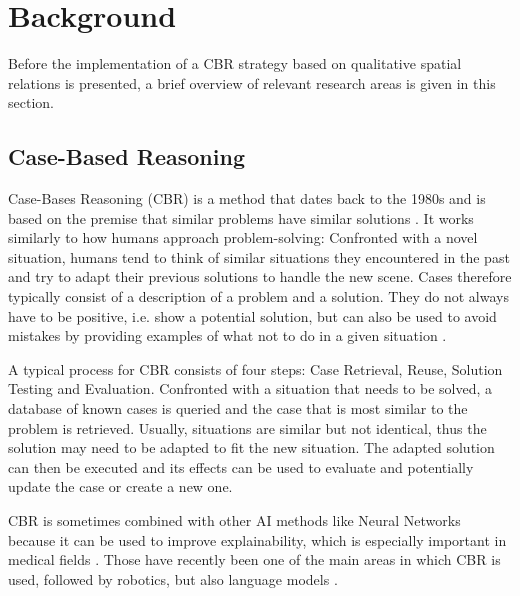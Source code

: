\section{Background}\label{sec:background}

Before the implementation of a \ac{CBR} strategy based on qualitative spatial relations is presented, a brief overview of relevant research areas is given in this section.

\subsection{Case-Based Reasoning}
Case-Bases Reasoning (CBR) is a method that dates back to the 1980s \cite{Schank1983DynamicM} and is based on the premise that similar problems have similar solutions \cite{KI-cbr-2009}.
It works similarly to how humans approach problem-solving: Confronted with a novel situation, humans tend to think of similar situations they encountered in the past and try to adapt their previous solutions to handle the new scene.
Cases therefore typically consist of a description of a problem and a solution.
They do not always have to be positive, i.e. show a potential solution, but can also be used to avoid mistakes by providing examples of what not to do in a given situation \cite{Kolodner1992}.

A typical process for \ac{CBR} consists of four steps: Case Retrieval, Reuse, Solution Testing and Evaluation.\cite{CBR-issues-variations-approaches}
Confronted with a situation that needs to be solved, a database of known cases is queried and the case that is most similar to the problem is retrieved.
Usually, situations are similar but not identical, thus the solution may need to be adapted to fit the new situation.
The adapted solution can then be executed and its effects can be used to evaluate and potentially update the case or create a new one.


\ac{CBR} is sometimes combined with other AI methods like Neural Networks because it can be used to improve explainability, which is especially important in medical fields \cite{expl-1amador2021case,expl-210.1007/978-3-030-58342-2_22,explainable-https://doi.org/10.48550/arxiv.1710.04806}.
Those have recently been one of the main areas in which CBR is used\cite{medical1, medical2}, followed by robotics\cite{QCBR}, but also language models \cite{text, text2}.

